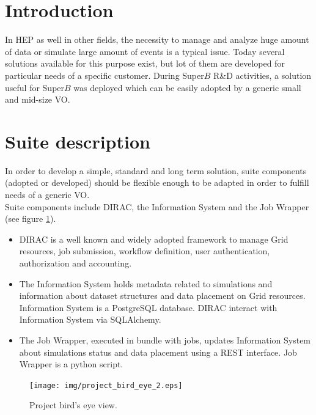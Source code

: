 \documentclass[a4paper]{jpconf}
\begin{document}
\section{Introduction}

In HEP as well in other fields, the necessity to manage and analyze huge amount of data or simulate large amount of events is a typical issue.
Today several solutions available for this purpose exist, but lot of them are developed for particular needs of a specific customer.
During Super$B$ R\&D activities, a solution useful for Super$B$ was deployed which can be easily adopted by a generic small and mid-size VO.

\section{Suite description}

In order to develop a simple, standard and long term solution, suite components (adopted or developed) should be flexible enough to be adapted in order to fulfill needs of a generic VO.\\
Suite components include DIRAC\cite{ref:dirac}, the Information System and the Job Wrapper (see figure \ref{fig:project_bird_eye}).\\
\begin{itemize}
\item DIRAC is a well known and widely adopted framework to manage Grid resources, job submission, workflow definition, user authentication, authorization and accounting.
\item The Information System holds metadata related to simulations and information about dataset structures and data placement on Grid resources. Information System is a PostgreSQL\cite{ref:postgres} database. DIRAC interact with Information System via SQLAlchemy\cite{ref:sqlalchemy}.
\item The Job Wrapper, executed in bundle with jobs, updates Information System about simulations status and data placement using a REST interface. Job Wrapper is a python script.
\end{itemize}

\begin{figure}[h]
\texttt{[image: img/project\_bird\_eye\_2.eps]}\hspace{2pc}%
\caption{\label{fig:project_bird_eye}Project bird's eye view.}
\end{figure}
\end{document}
